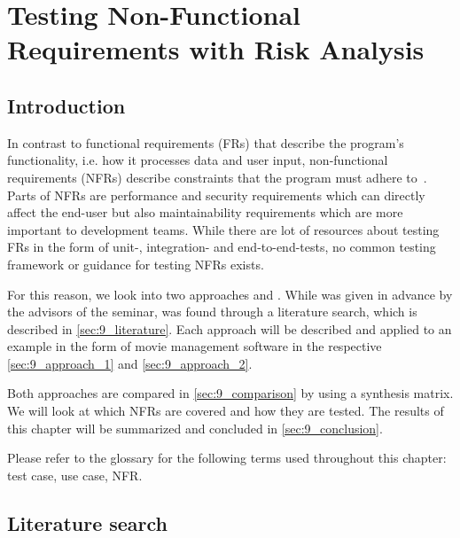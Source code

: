 %
%
%

\chapter{Testing Non-Functional Requirements with Risk Analysis}\label{sec:topic_9}


\section{Introduction}

In contrast to functional requirements (FRs) that describe the program's functionality, i.e. how it processes data and user input, non-functional requirements (NFRs) describe constraints that the program must adhere to~\cite{SWEBOK}.
Parts of NFRs are performance and security requirements which can directly affect the end-user but also maintainability requirements which are more important to development teams.
While there are lot of resources about testing FRs in the form of unit-, integration- and end-to-end-tests, no common testing framework or guidance for testing NFRs exists.

For this reason, we look into two approaches \cite{ZouPavlovski2008} and \cite{Lagerstedt2014}.
While \cite{ZouPavlovski2008} was given in advance by the advisors of the seminar, \cite{Lagerstedt2014} was found through a literature search, which is described in \autoref{sec:9_literature}.
Each approach will be described and applied to an example in the form of movie management software in the respective \autoref{sec:9_approach_1} and \autoref{sec:9_approach_2}. 

Both approaches are compared in \autoref{sec:9_comparison} by using a synthesis matrix. We will look at which NFRs are covered and how they are tested.
The results of this chapter will be summarized and concluded in \autoref{sec:9_conclusion}.

Please refer to the glossary for the following terms used throughout this chapter:
test case, use case, NFR.




\section{Literature search} \label{sec:9_literature}

